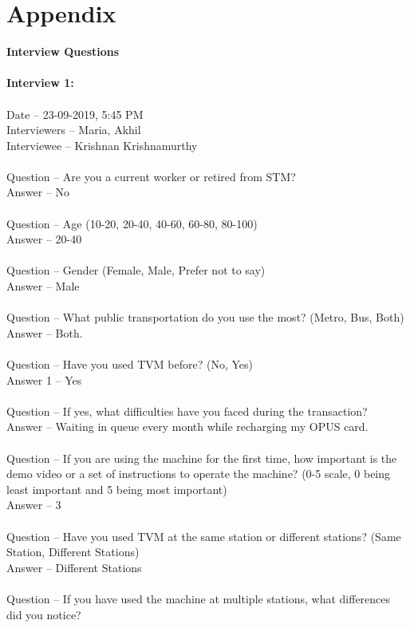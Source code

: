 \documentclass[a4paper, 11pt]{report}
\begin{document}
{\chapter{Appendix}
\textbf{\LARGE{Interview Questions}}\\\\
\textbf{Interview 1:}\\\\
Date – 23-09-2019, 5:45 PM\\
Interviewers – Maria, Akhil\\
Interviewee – Krishnan Krishnamurthy \\\\
Question – Are you a current worker or retired from STM?\\
Answer – No\\\\
Question – Age (10-20, 20-40, 40-60, 60-80, 80-100)\\
Answer – 20-40\\\\
Question – Gender (Female, Male, Prefer not to say)\\
Answer – Male\\\\
Question – What public transportation do you use the most? (Metro, Bus, Both)\\
Answer – Both.\\\\
Question – Have you used TVM before? (No, Yes)\\
Answer 1 – Yes\\\\
Question – If yes, what difficulties have you faced during the transaction?\\
Answer – Waiting in queue every month while recharging my OPUS card.\\\\
Question – If you are using the machine for the first time, how important is the demo video or a set of instructions to operate the machine? (0-5 scale, 0 being least important and 5 being most important)\\
Answer – 3\\\\
Question – Have you used TVM at the same station or different stations? (Same Station, Different Stations)\\
Answer – Different Stations\\\\
Question – If you have used the machine at multiple stations, what differences did you notice?\\
}
\end{document}
